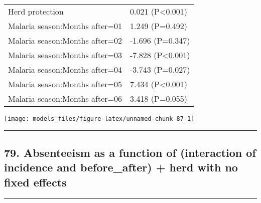\documentclass[]{article}
\begin{document}
\begin{longtable}[t]{ll}
\hspace{1em}Herd protection & 0.021 (P<0.001)\\
\hspace{1em}Malaria season:Months after=01 & 1.249 (P=0.492)\\
\hspace{1em}Malaria season:Months after=02 & -1.696 (P=0.347)\\
\hspace{1em}Malaria season:Months after=03 & -7.828 (P<0.001)\\
\hspace{1em}Malaria season:Months after=04 & -3.743 (P=0.027)\\
\hspace{1em}Malaria season:Months after=05 & 7.434 (P<0.001)\\
\hspace{1em}Malaria season:Months after=06 & 3.418 (P=0.055)\\*
\end{longtable}

\begin{center}\texttt{[image: models\_files/figure-latex/unnamed-chunk-87-1]} \end{center}

\newpage

\begin{center}\rule{0.5\linewidth}{\linethickness}\end{center}

\subsection{79. Absenteeism as a function of (interaction of incidence
and before\_after) + herd with no fixed
effects}\label{absenteeism-as-a-function-of-interaction-of-incidence-and-before_after-herd-with-no-fixed-effects}

\begin{center}\rule{0.5\linewidth}{\linethickness}\end{center}
\end{document}

